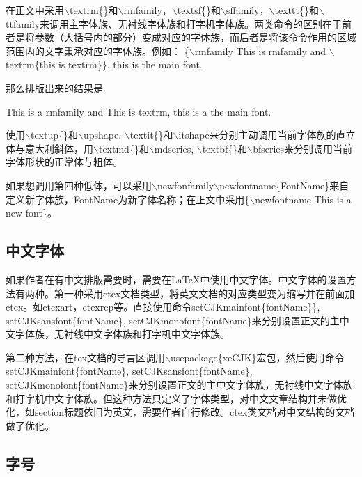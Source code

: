 \documentclass[12pt]{book}
\begin{document}

在正文中采用$\backslash$textrm\{\}和$\backslash$rmfamily，$\backslash$textsf\{\}和$\backslash$sffamily，$\backslash$texttt\{\}和$\backslash$ttfamily来调用主字体族、无衬线字体族和打字机字体族。两类命令的区别在于前者是将参数（大括号内的部分）变成对应的字体族，而后者是将该命令作用的区域范围内的文字秉承对应的字体族。例如：
\{$\backslash$rmfamily This is rmfamily and $\backslash$textrm\{this is textrm\}\}, this is the main font.

那么排版出来的结果是

{\rmfamily This is a rmfamily and \textrm{This is textrm}}, this is a the main font. %


使用$\backslash$textup\{\}和$\backslash$upshape, $\backslash$textit\{\}和$\backslash$itshape来分别主动调用当前字体族的直立体与意大利斜体，用$\backslash$textmd\{\}和$\backslash$mdseries, $\backslash$textbf\{\}和$\backslash$bfseries来分别调用当前字体形状的正常体与粗体。

如果想调用第四种低体，可以采用$\backslash$newfonfamily$\backslash$newfontname\{FontName\}来自定义新字体族，FontName为新字体名称；在正文中采用\{$\backslash$newfontname This is a new font\}。

\subsection{中文字体}

如果作者在有中文排版需要时，需要在\LaTeX{}中使用中文字体。中文字体的设置方法有两种。第一种采用ctex文档类型，将英文文档的对应类型变为缩写并在前面加ctex。如ctexart，ctexrep等。直接使用命令setCJKmainfont\{fontName\}\}, setCJKsansfont\{fontName\}, setCJKmonofont\{fontName\}来分别设置正文的主中文字体族，无衬线中文字体族和打字机中文字体族。

第二种方法，在tex文档的导言区调用$\backslash$usepackage\{xeCJK\}宏包，然后使用命令setCJKmainfont\{fontName\}, setCJKsansfont\{fontName\}, setCJKmonofont\{fontName\}来分别设置正文的主中文字体族，无衬线中文字体族和打字机中文字体族。但这种方法只定义了字体类型，对中文文章结构并未做优化，如section标题依旧为英文，需要作者自行修改。ctex类文档对中文结构的文档做了优化。

\subsection{字号}
\end{document}
